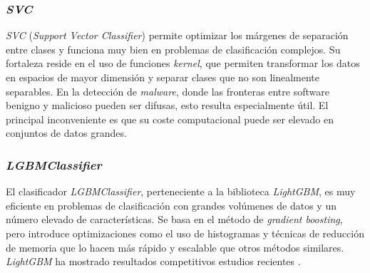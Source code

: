 \subsubsection{\textit{SVC}}
\label{subsubsec:svc}

\textit{SVC} (\textit{Support Vector Classifier}) permite optimizar los márgenes de separación entre clases y funciona muy bien en problemas de clasificación complejos. Su fortaleza reside en el uso de funciones \textit{kernel}, que permiten transformar los datos en espacios de mayor dimensión y separar clases que no son linealmente separables. En la detección de \textit{malware}, donde las fronteras entre software benigno y malicioso pueden ser difusas, esto resulta especialmente útil. El principal inconveniente es que su coste computacional puede ser elevado en conjuntos de datos grandes.

\subsubsection{\textit{LGBMClassifier}}
\label{subsubsec:lgbmclassifier}

El clasificador \textit{LGBMClassifier}, perteneciente a la biblioteca \textit{LightGBM}, es muy eficiente en problemas de clasificación con grandes volúmenes de datos y un número elevado de características. Se basa en el método de \textit{gradient boosting}, pero introduce optimizaciones como el uso de histogramas y técnicas de reducción de memoria que lo hacen más rápido y escalable que otros métodos similares. \textit{LightGBM} ha mostrado resultados competitivos estudios recientes \cite{estudio_lgbm}.
